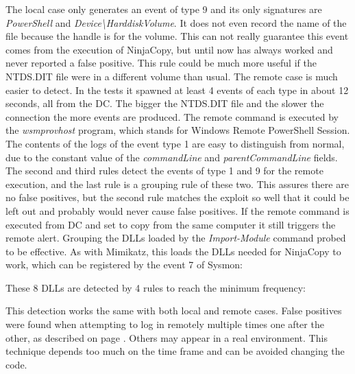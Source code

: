 \linej
The local case only generates an event of type 9 and its only signatures are \textit{PowerShell} and \textit{Device{\textbackslash}HarddiskVolume}. It does not even record the name of the file because the handle is for the volume. This can not really guarantee this event comes from the execution of NinjaCopy, but until now has always worked and never reported a false positive. This rule could be much more useful if the NTDS.DIT file were in a different volume than usual.
\linej
\linej
The remote case is much easier to detect. In the tests it spawned at least 4 events of each type in about 12 seconds, all from the DC.
The bigger the NTDS.DIT file and the slower the connection the more events are produced.
\linej
The remote command is executed by the \textit{wsmprovhost} program, which stands for Windows Remote PowerShell Session.
The contents of the logs of the event type 1 are easy to distinguish from normal, due to the constant value of the \textit{commandLine} and \textit{parentCommandLine} fields.
\linej
The second and third rules detect the events of type 1 and 9 for the remote execution, and the last rule is a grouping rule of these two. This assures there are no false positives, but the second rule matches the exploit so well that it could be left out and probably would never cause false positives.
\linej
If the remote command is executed from DC and set to copy from the same computer it still triggers the remote alert.
\linej
\linej
Grouping the DLLs loaded by the \textit{Import-Module} command probed to be effective. As with Mimikatz, this loads the DLLs needed for NinjaCopy to work, which can be registered by the event 7 of Sysmon:

\linej
These 8 DLLs are detected by 4 rules to reach the minimum frequency:

\linej
This detection works the same with both local and remote cases.
\linej
False positives were found when attempting to log in remotely multiple times one after the other, as described on page \pageref{reverse_login}.
Others may appear in a real environment.
This technique depends too much on the time frame and can be avoided changing the code.

